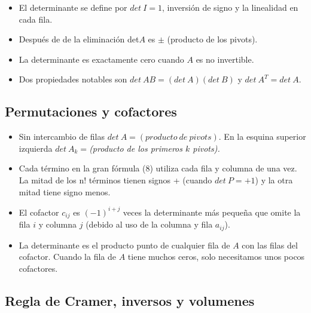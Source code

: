 \documentclass[]{article}
\begin{document}
\begin{itemize}
	
	\item El determinante se define por $ det\ I=1 $, inversi\'on de signo y la linealidad en cada fila. 
	
	\item Despu\'es de de la eliminaci\'on det$ A $ es $ \pm $ (producto de los pivots).
	
	\item La determinante es exactamente cero cuando $ A $ es no invertible. 
	
	\item Dos propiedades notables son $ det\ AB=(det\ A)(det\ B) $ y $ det\ A^{T}=det\ A $. 
	
\end{itemize}

\subsection{Permutaciones y cofactores}

\begin{itemize}
	
	\item Sin intercambio de filas $ det\ A = (producto\ de\ pivots) $. En la esquina superior izquierda $ det\ A_{k} =$\textit{(producto de los primeros $ k $ pivots). }
	
	\item Cada t\'ermino en la gran f\'ormula (8) utiliza cada fila y columna de una vez. La mitad de los n! t\'erminos tienen signos + (cuando $ det\ P = +1 $) y la otra mitad tiene signo menos.
	
	\item El cofactor $ c_{ij} $ es $ (-1)^{i+j} $ veces la determinante m\'as pequeña que omite la fila $ i $ y columna $ j $ (debido al uso de la columna y fila $ a_{ij} $). 
	
	\item La determinante es el producto punto de cualquier fila de $ A $ con las filas del cofactor. Cuando la fila de $ A $ tiene muchos ceros, solo necesitamos unos pocos cofactores. 
	
	\end{itemize}
	
\subsection{Regla de Cramer, inversos y volumenes}
\end{document}
